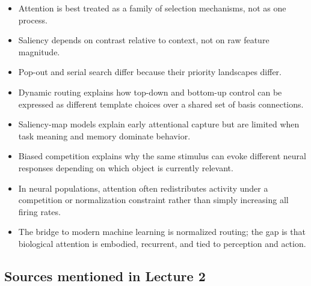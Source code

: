 \begin{itemize}
    \item Attention is best treated as a family of selection mechanisms, not as one process.
    \item Saliency depends on contrast relative to context, not on raw feature magnitude.
    \item Pop-out and serial search differ because their priority landscapes differ.
    \item Dynamic routing explains how top-down and bottom-up control can be expressed as different template choices over a shared set of basis connections.
    \item Saliency-map models explain early attentional capture but are limited when task meaning and memory dominate behavior.
    \item Biased competition explains why the same stimulus can evoke different neural responses depending on which object is currently relevant.
    \item In neural populations, attention often redistributes activity under a competition or normalization constraint rather than simply increasing all firing rates.
    \item The bridge to modern machine learning is normalized routing; the gap is that biological attention is embodied, recurrent, and tied to perception and action.
\end{itemize}

\subsection*{Sources mentioned in Lecture 2}

